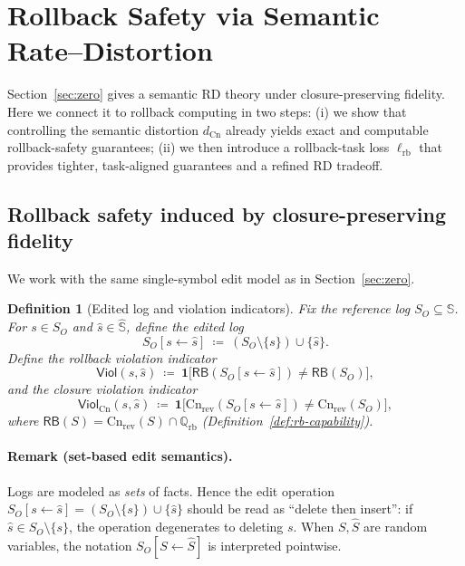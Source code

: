 \documentclass[twoside]{article}
\newtheorem{definition}[theorem]{Definition}
\newcommand{\Cn}{\mathrm{Cn}}
\newcommand{\1}{\mathbf{1}}
\begin{document}
\section{Rollback Safety via Semantic Rate--Distortion}
\label{sec:rb}

Section~\ref{sec:zero} gives a semantic RD theory under closure-preserving fidelity.
Here we connect it to rollback computing in two steps:
(i) we show that controlling the semantic distortion \(d_{\Cn}\) already yields exact and computable rollback-safety guarantees;
(ii) we then introduce a rollback-task loss \(\ell_{\mathrm{rb}}\) that provides tighter, task-aligned guarantees and a refined RD tradeoff.

\subsection{Rollback safety induced by closure-preserving fidelity}
\label{sec:rb-from-closure}

We work with the same single-symbol edit model as in Section~\ref{sec:zero}.

\begin{definition}[Edited log and violation indicators]
\label{def:viol-indic}
Fix the reference log \(S_O\subseteq \mathbb{S}\). For \(s\in S_O\) and \(\hat s\in \hat{\mathbb{S}}\), define the edited log
\[
S_O[s\leftarrow \hat s]\ \coloneqq\ (S_O\setminus\{s\})\cup\{\hat s\}.
\]
Define the \emph{rollback violation indicator}
\[
\mathsf{Viol}(s,\hat s)\ \coloneqq\ \1\!\big[\mathsf{RB}(S_O[s\leftarrow \hat s])\neq \mathsf{RB}(S_O)\big],
\]
and the \emph{closure violation indicator}
\[
\mathsf{Viol}_{\Cn}(s,\hat s)\ \coloneqq\ \1\!\big[\Cn_{\mathrm{rev}}(S_O[s\leftarrow \hat s])\neq \Cn_{\mathrm{rev}}(S_O)\big],
\]
where \(\mathsf{RB}(S)=\Cn_{\mathrm{rev}}(S)\cap \mathbb{Q}_{\mathrm{rb}}\) (Definition~\ref{def:rb-capability}).
\end{definition}

\paragraph{Remark (set-based edit semantics).}
Logs are modeled as \emph{sets} of facts. Hence the edit operation
\(S_O[s\leftarrow \hat s]=(S_O\setminus\{s\})\cup\{\hat s\}\) should be read as ``delete then insert'':
if \(\hat s\in S_O\setminus\{s\}\), the operation degenerates to deleting \(s\).
When \(S,\hat S\) are random variables, the notation \(S_O[S\leftarrow \hat S]\) is interpreted pointwise.
\end{document}
